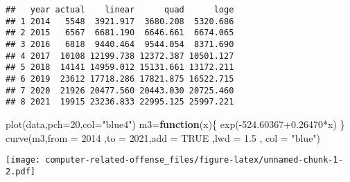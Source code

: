 \documentclass[
]{article}
\newenvironment{Shaded}{\begin{snugshade}}{\end{snugshade}}
\newcommand{\AttributeTok}[1]{\textcolor[rgb]{0.77,0.63,0.00}{#1}}
\newcommand{\ConstantTok}[1]{\textcolor[rgb]{0.00,0.00,0.00}{#1}}
\newcommand{\ControlFlowTok}[1]{\textcolor[rgb]{0.13,0.29,0.53}{\textbf{#1}}}
\newcommand{\DecValTok}[1]{\textcolor[rgb]{0.00,0.00,0.81}{#1}}
\newcommand{\FloatTok}[1]{\textcolor[rgb]{0.00,0.00,0.81}{#1}}
\newcommand{\FunctionTok}[1]{\textcolor[rgb]{0.00,0.00,0.00}{#1}}
\newcommand{\NormalTok}[1]{#1}
\newcommand{\OtherTok}[1]{\textcolor[rgb]{0.56,0.35,0.01}{#1}}
\newcommand{\SpecialCharTok}[1]{\textcolor[rgb]{0.00,0.00,0.00}{#1}}
\newcommand{\StringTok}[1]{\textcolor[rgb]{0.31,0.60,0.02}{#1}}
\begin{document}
\begin{Shaded}
\end{Shaded}

\begin{verbatim}
##   year actual    linear      quad      loge
## 1 2014   5548  3921.917  3680.208  5320.686
## 2 2015   6567  6681.190  6646.661  6674.065
## 3 2016   6818  9440.464  9544.054  8371.690
## 4 2017  10108 12199.738 12372.387 10501.127
## 5 2018  14141 14959.012 15131.661 13172.211
## 6 2019  23612 17718.286 17821.875 16522.715
## 7 2020  21926 20477.560 20443.030 20725.460
## 8 2021  19915 23236.833 22995.125 25997.221
\end{verbatim}

\begin{Shaded}
\begin{Highlighting}[]
\FunctionTok{plot}\NormalTok{(data,}\AttributeTok{pch=}\DecValTok{20}\NormalTok{,}\AttributeTok{col=}\StringTok{"blue4"}\NormalTok{)}
\NormalTok{m3}\OtherTok{=}\ControlFlowTok{function}\NormalTok{(x)\{}
  \FunctionTok{exp}\NormalTok{(}\SpecialCharTok{{-}}\FloatTok{524.60367+0.26470}\SpecialCharTok{*}\NormalTok{x)}
\NormalTok{\}}
\FunctionTok{curve}\NormalTok{(m3,}\AttributeTok{from =} \DecValTok{2014}\NormalTok{ ,}\AttributeTok{to =} \DecValTok{2021}\NormalTok{,}\AttributeTok{add =} \ConstantTok{TRUE}\NormalTok{ ,}\AttributeTok{lwd =} \FloatTok{1.5}\NormalTok{ , }\AttributeTok{col =} \StringTok{"blue"}\NormalTok{)}
\end{Highlighting}
\end{Shaded}

\texttt{[image: computer-related-offense\_files/figure-latex/unnamed-chunk-1-2.pdf]}
\end{document}
